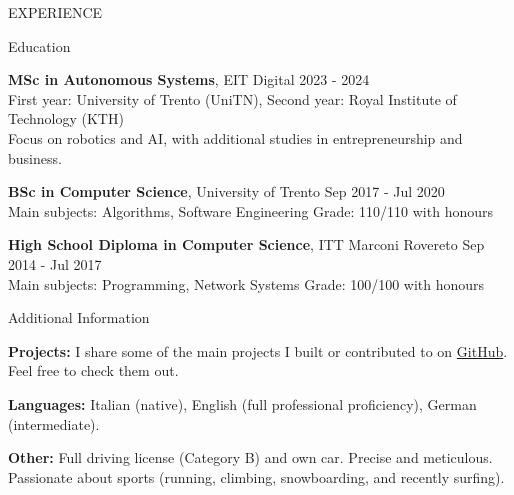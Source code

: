 \documentclass{resume} %
\begin{document}
\begin{rSection}{EXPERIENCE}

\end{rSection} 


\begin{rSection}{Education}


{\bf MSc in Autonomous Systems}, EIT Digital \hfill {2023 - 2024}\\
First year: University of Trento (UniTN), Second year: Royal Institute of Technology (KTH) \\
Focus on robotics and AI, with additional studies in entrepreneurship and business.

{\bf BSc in Computer Science}, University of Trento \hfill {Sep 2017 - Jul 2020} \\
Main subjects: Algorithms, Software Engineering  \quad Grade: 110/110 with honours

{\bf High School Diploma in Computer Science}, ITT Marconi Rovereto \hfill {Sep 2014 - Jul 2017} \\
Main subjects: Programming, Network Systems \quad Grade: 100/100 with honours

\end{rSection}


\begin{rSection}{Additional Information}

\textbf{Projects:} I share some of the main projects I built or contributed to on \href{https://github.com/riccardoperiotto}{GitHub}. Feel free to check them out.

\textbf{Languages:} Italian (native), English (full professional proficiency), German (intermediate).

\textbf{Other:} Full driving license (Category B) and own car. Precise and meticulous. Passionate about sports (running, climbing, snowboarding, and recently surfing).

\end{rSection}
\end{document}
